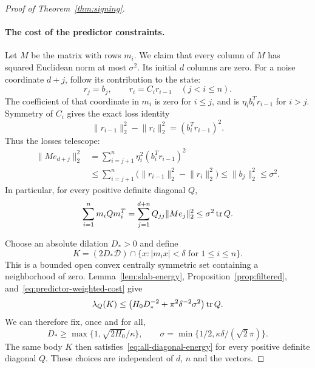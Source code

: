 \begin{proof}[Proof of Theorem~\ref{thm:signing}]
\paragraph{The cost of the predictor constraints.}
Let $M$ be the matrix with rows $m_i$.  We claim that every column of $M$
has squared Euclidean norm at most $\sigma^2$.  Its initial $d$ columns are
zero.  For a noise coordinate $d+j$, follow its contribution to the state:
\[
 r_j=b_j,\qquad r_i=C_ir_{i-1}\quad(j<i\le n).
\]
The coefficient of that coordinate in $m_i$ is zero for $i\le j$, and is
$\eta_i b_i^Tr_{i-1}$ for $i>j$.  Symmetry of $C_i$ gives the exact loss
identity
\[
 \lVert r_{i-1}\rVert_2^2-\lVert r_i\rVert_2^2
 =(b_i^Tr_{i-1})^2.
\]
Thus the losses telescope:
\begin{equation}\label{eq:predictor-columns}
 \begin{aligned}
 \lVert Me_{d+j}\rVert_2^2
 &=\sum_{i=j+1}^n\eta_i^2(b_i^Tr_{i-1})^2\\
 &\le\sum_{i=j+1}^n
       \bigl(\lVert r_{i-1}\rVert_2^2-\lVert r_i\rVert_2^2\bigr)
 \le\lVert b_j\rVert_2^2\le\sigma^2.
 \end{aligned}
\end{equation}
In particular, for every positive definite diagonal $Q$,
\begin{equation}\label{eq:predictor-weighted-cost}
 \sum_{i=1}^n m_iQm_i^T
 =\sum_{j=1}^{d+n}Q_{jj}\lVert Me_j\rVert_2^2
 \le\sigma^2\operatorname{tr} Q.
\end{equation}

Choose an absolute dilation $D_*>0$ and define
\begin{equation}\label{eq:application-body}
 K=(2D_*\mathcal D)\cap
   \{x:|m_ix|<\delta\text{ for }1\le i\le n\}.
\end{equation}
This is a bounded open convex centrally symmetric set containing a
neighborhood of zero.  Lemma~\ref{lem:slab-energy},
Proposition~\ref{prop:filtered}, and~\eqref{eq:predictor-weighted-cost} give
\begin{equation}\label{eq:application-energy}
 \lambda_Q(K)
 \le\left(H_0D_*^{-2}+\pi^2\delta^{-2}\sigma^2\right)\operatorname{tr} Q.
\end{equation}
We can therefore fix, once and for all,
\begin{equation}\label{eq:absolute-parameters}
 D_*\ge\max\{1,\sqrt{2H_0}/\kappa\},\qquad
 \sigma=\min\{1/2,\kappa\delta/(\sqrt2\pi)\}.
\end{equation}
The same body $K$ then satisfies~\eqref{eq:all-diagonal-energy} for every
positive definite diagonal $Q$.  These choices are independent of $d$, $n$
and the vectors.


\end{proof}
